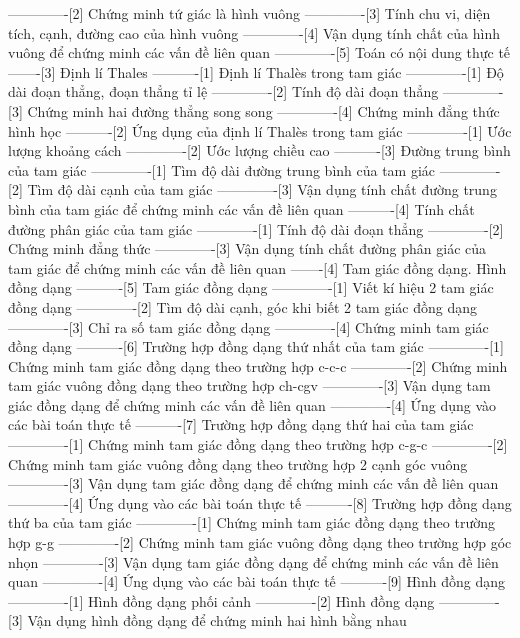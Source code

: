 -------------[2] Chứng minh tứ giác là hình vuông
-------------[3] Tính chu vi, diện tích, cạnh, đường cao của hình vuông
-------------[4] Vận dụng tính chất của hình vuông để chứng minh các vấn đề liên quan
-------------[5] Toán có nội dung thực tế
-------[3] Định lí Thales
----------[1] Định lí Thalès trong tam giác
-------------[1] Độ dài đoạn thẳng, đoạn thẳng tỉ lệ
-------------[2] Tính độ dài đoạn thẳng
-------------[3] Chứng minh hai đường thẳng song song
-------------[4] Chứng minh đẳng thức hình học
----------[2] Ứng dụng của định lí Thalès trong tam giác
-------------[1] Ước lượng khoảng cách
-------------[2] Ước lượng chiều cao
----------[3] Đường trung bình của tam giác
-------------[1] Tìm độ dài đường trung bình của tam giác
-------------[2] Tìm độ dài cạnh của tam giác
-------------[3] Vận dụng tính chất đường trung bình của tam giác để chứng minh các vấn đề liên quan
----------[4] Tính chất đường phân giác của tam giác
-------------[1] Tính độ dài đoạn thẳng
-------------[2] Chứng minh đẳng thức
-------------[3] Vận dụng tính chất đường phân giác của tam giác để chứng minh các vấn đề liên quan
-------[4] Tam giác đồng dạng. Hình đồng dạng
----------[5] Tam giác đồng dạng
-------------[1] Viết kí hiệu 2 tam giác đồng dạng
-------------[2] Tìm độ dài cạnh, góc khi biết 2 tam giác đồng dạng
-------------[3] Chỉ ra số tam giác đồng dạng
-------------[4] Chứng minh tam giác đồng dạng
----------[6] Trường hợp đồng dạng thứ nhất của tam giác
-------------[1] Chứng minh tam giác đồng dạng theo trường hợp c-c-c
-------------[2] Chứng minh tam giác vuông đồng dạng theo trường hợp ch-cgv
-------------[3] Vận dụng tam giác đồng dạng để chứng minh các vấn đề liên quan
-------------[4] Ứng dụng vào các bài toán thực tế
----------[7] Trường hợp đồng dạng thứ hai của tam giác
-------------[1] Chứng minh tam giác đồng dạng theo trường hợp c-g-c
-------------[2] Chứng minh tam giác vuông đồng dạng theo trường hợp 2 cạnh góc vuông
-------------[3] Vận dụng tam giác đồng dạng để chứng minh các vấn đề liên quan
-------------[4] Ứng dụng vào các bài toán thực tế
----------[8] Trường hợp đồng dạng thứ ba của tam giác
-------------[1] Chứng minh tam giác đồng dạng theo trường hợp g-g
-------------[2] Chứng minh tam giác vuông đồng dạng theo trường hợp góc nhọn
-------------[3] Vận dụng tam giác đồng dạng để chứng minh các vấn đề liên quan
-------------[4] Ứng dụng vào các bài toán thực tế
----------[9] Hình đồng dạng
-------------[1] Hình đồng dạng phối cảnh
-------------[2] Hình đồng dạng
-------------[3] Vận dụng hình đồng dạng để chứng minh hai hình bằng nhau

